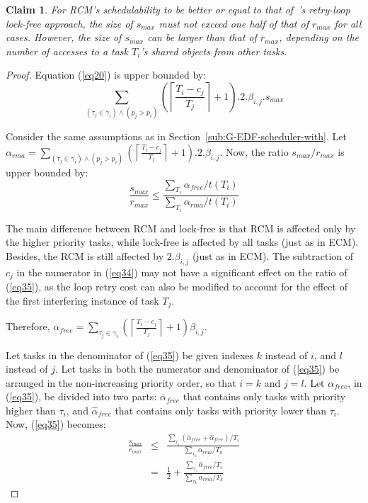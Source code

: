 \documentclass{sig-alternate}
\newtheorem{clm}{Claim}
\begin{document}
\begin{clm}
For RCM's schedulability to be better or equal to that of~\cite{key-5}'s retry-loop lock-free approach, the size of $s_{max}$ must not exceed one half of that of $r_{max}$ for all cases.
However, the size of $s_{max}$ can be larger than that of $r_{max}$, depending on the number of accesses to a task $T_i$'s shared objects from other tasks.
\end{clm}
\begin{proof}
Equation (\ref{eq20}) is upper bounded by:
 \begin{equation}
\sum_{\left(\tau_{j}\in\gamma_{i}\right)\wedge\left(p_{j}> p_{i}\right)}\left(\left\lceil\frac{T_{i}-c_{j}}{T_{j}}\right\rceil+1\right).2.\beta_{i,j}.s_{max}
\label{eq34}\end{equation}

Consider the same assumptions as in Section~\ref{sub:G-EDF-scheduler-with}.
Let $\alpha_{rma}=\sum_{\left(\tau_{j}\in\gamma_{i}\right)\wedge\left(p_{j}> p_{i}\right)}\left(\left\lceil\frac{T_{i}-c_{j}}{T_{j}}\right\rceil+1\right).2.\beta_{i,j}$. Now, the ratio $s_{max}/r_{max}$ is upper bounded by:
\begin{equation}
\frac{s_{max}}{r_{max}}\le\frac{\sum_{T_{i}}\alpha_{free}/t\left(T_{i}\right)}{\sum_{T_{i}}\alpha_{rma}/t\left(T_{i}\right)}
\label{eq35}\end{equation}

The main difference between RCM and lock-free is that RCM is affected only by the higher priority tasks, while lock-free is affected by all tasks (just as in ECM). 
Besides, the RCM
is still affected by $2.\beta_{i,j}$ (just as in ECM).
The subtraction of $c_{j}$ in the numerator in (\ref{eq34}) may not
have a significant effect on the ratio of (\ref{eq35}), as the loop retry 
cost can also be modified to account for the effect of the first interfering
instance of task $T_{j}$. 


Therefore, 
$\alpha_{free} = \sum_{\tau_{j}\in\gamma_{i}}\left(\left\lceil\frac{T_{i}-c_j}{T_{j}}\right\rceil + 1 \right)\beta_{i,j}$.

Let tasks in the denominator of (\ref{eq35}) be given indexes $k$ instead of $i$, and $l$ instead of $j$. Let tasks in both the numerator and denominator of (\ref{eq35}) be arranged in the non-increasing priority order, so that $i=k$ and $j=l$. Let $\alpha_{free}$, in (\ref{eq35}), be divided into two parts: $\bar{\alpha}_{free}$ that contains only tasks with priority higher than $\tau_i$, and $\hat{\alpha}_{free}$ that contains only tasks with priority lower than $\tau_i$. Now, (\ref{eq35}) becomes:
\begin{eqnarray}
\frac{s_{max}}{r_{max}} & \le & \frac{\sum_{\tau_{i}}(\bar{\alpha}_{free}+\hat{\alpha}_{free})/T_{i}}{\sum_{\tau_{k}}\alpha_{rma}/T_{k}}\nonumber \\
 & = & \frac{1}{2}+\frac{\sum_{\tau_{i}}\hat{\alpha}_{free}/T_{i}}{\sum_{\tau_{k}}\alpha_{rma}/T_{k}}\label{eq36}\end{eqnarray}


\end{proof}
\end{document}
